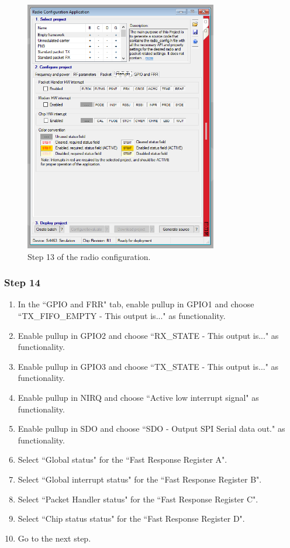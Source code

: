 \begin{figure}[!h]
	\begin{center}
		\includegraphics[width=0.75\textwidth]{figures/wds-tutorial/wds-tutorial-13.png}
		\caption{Step 13 of the radio configuration.}
		\label{fig:wds-tutorial-step-13}
	\end{center}
\end{figure}

\subsubsection{Step 14}

\begin{enumerate}
    \item In the ``GPIO and FRR" tab, enable pullup in GPIO1 and choose ``TX\_FIFO\_EMPTY - This output is..." as functionality.
    \item Enable pullup in GPIO2 and choose ``RX\_STATE - This output is..." as functionality.
    \item Enable pullup in GPIO3 and choose ``TX\_STATE - This output is..." as functionality.
    \item Enable pullup in NIRQ and choose ``Active low interrupt signal" as functionality.
    \item Enable pullup in SDO and choose ``SDO - Output SPI Serial data out." as functionality.
    \item Select ``Global status" for the ``Fast Response Register A".
    \item Select ``Global interrupt status" for the ``Fast Response Register B".
    \item Select ``Packet Handler status" for the ``Fast Response Register C".
    \item Select ``Chip status status" for the ``Fast Response Register D".
    \item Go to the next step.
\end{enumerate}

